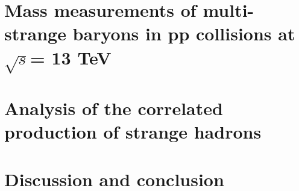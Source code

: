 \documentclass[ALICE,manyauthors]{cernphprep}
\newcommand {\sqrtS}        {\ensuremath{\sqrt{s}}\xspace}
\begin{document}
 \newpage  %
 \newpage %
\chapter{Mass measurements of multi-strange baryons in pp collisions at \sqrtS = 13 TeV}
\label{chap:CPTAnalysis}
 \newpage %
\chapter{Analysis of the correlated production of strange hadrons}
\label{chap:CorrelatedAnalysis}
 \newpage %
\chapter{Discussion and conclusion}
\label{chap:Conclusion}



\newpage


 \newpage  %



\cleardoublepage %








\footnotesize

%   
\end{document}
